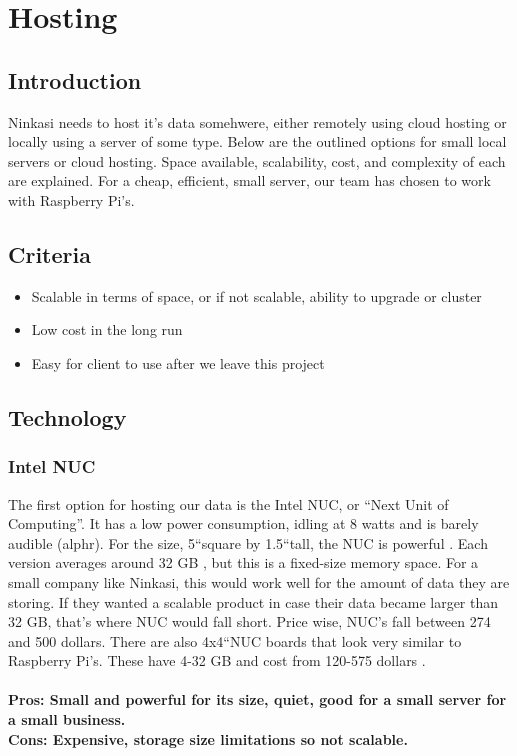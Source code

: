 \documentclass[draftclsnofoot,onecolumn,letterpaper,10pt,compsoc]{IEEEtran}
\begin{document}
		\section{Hosting}
		    \subsection{Introduction}
				Ninkasi needs to host it's data somehwere, either remotely using cloud hosting or locally using a server of some type.
				Below are the outlined options for small local servers or cloud hosting.
				Space available, scalability, cost, and complexity of each are explained.
				For a cheap, efficient, small server, our team has chosen to work with Raspberry Pi's.
				\subsection{Criteria}
				\begin{itemize}
		  \item Scalable in terms of space, or if not scalable, ability to upgrade or cluster
		  \item Low cost in the long run
		  \item Easy for client to use after we leave this project
		\end{itemize}

      \subsection{Technology}
  			\subsubsection{Intel NUC}
		            The first option for hosting our data is the Intel NUC, or “Next Unit of Computing”.
								It has a low power consumption, idling at 8 watts and is barely audible (alphr). For the size, 5\textquotedblleft square by 1.5\textquotedblleft tall, the NUC is powerful \cite{IntelNUCReview}.
								Each version averages around 32 GB \cite{Intel}, but this is a fixed-size memory space.
								For a small company like Ninkasi, this would work well for the amount of data they are storing.
								If they wanted a scalable product in case their data became larger than 32 GB, that’s where NUC would fall short.
								Price wise, NUC's  fall between 274 and 500 dollars\cite{PCWorld}.
								There are also 4x4\textquotedblleft NUC boards that look very similar to Raspberry Pi's.
								These have 4-32 GB and cost from 120-575 dollars \cite{Intel}.
						\\ \\
						\textbf{Pros: Small and powerful for its size, quiet, good for a small server for a small business.}
						\\
		        \textbf{Cons: Expensive, storage size limitations so not scalable.}
\end{document}
